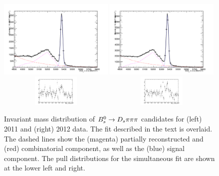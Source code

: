 \begin{figure}[h]
\includegraphics[height=7.cm,width=0.49\textwidth]{figs/3pi_BmassFit_sim11.pdf}
\includegraphics[height=7.cm,width=0.49\textwidth]{figs/3pi_BmassFit_sim12.pdf}\\
\includegraphics[width=0.49\textwidth,height=1.5cm]{figs/3pi_pull_sim11.pdf}
\includegraphics[width=0.49\textwidth,height=1.5cm]{figs/3pi_pull_sim12.pdf}
\caption{Invariant mass distribution of ${{B}^0_{s}}\rightarrow{\ensuremath{{D}_{s}}}{\ensuremath{\pi}}{\ensuremath{\pi}}{\ensuremath{\pi}}$ candidates for (left) 2011 and (right) 2012 data.
The fit described in the text is overlaid. The dashed lines show the (magenta) partially reconstructed and (red) combinatorial component, as well as the (blue) signal component. 
The pull distributions for the simultaneous fit are shown at the lower left and right.}
\label{fig: BsDs3piFit}
\end{figure}

